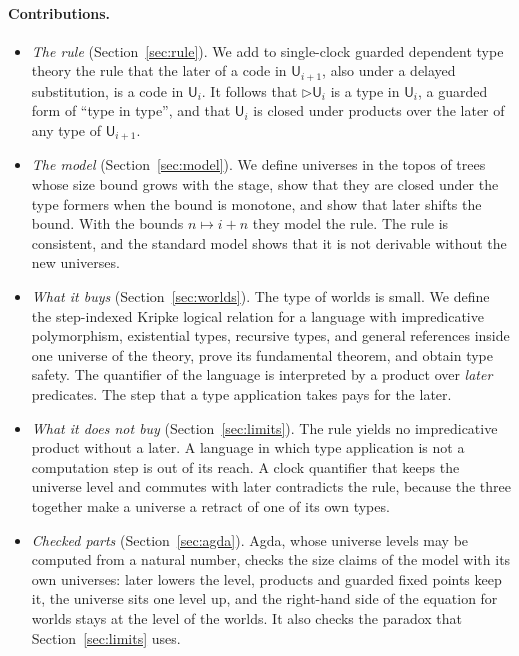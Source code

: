 \documentclass[acmsmall,nonacm,screen]{acmart}
\newcommand{\later}{{\triangleright}}
\newcommand{\Uv}{\mathsf{U}}
\begin{document}
\paragraph{Contributions.}
\begin{itemize}
\item \emph{The rule} (Section~\ref{sec:rule}). We add to single-clock guarded dependent type
  theory the rule that the later of a code in $\Uv_{i+1}$, also under a delayed substitution,
  is a code in $\Uv_i$. It follows that $\later\Uv_i$ is a type in $\Uv_i$, a guarded form of
  ``type in type'', and that $\Uv_i$ is closed under products over the later of any type of
  $\Uv_{i+1}$.
\item \emph{The model} (Section~\ref{sec:model}). We define universes in the topos of trees
  whose size bound grows with the stage, show that they are closed under the type formers
  when the bound is monotone, and show that later shifts the bound. With the bounds
  $n \mapsto i+n$ they model the rule. The rule is consistent, and the standard model shows
  that it is not derivable without the new universes.
\item \emph{What it buys} (Section~\ref{sec:worlds}). The type of worlds is small. We define
  the step-indexed Kripke logical relation for a language with impredicative polymorphism,
  existential types, recursive types, and general references inside one universe of the
  theory, prove its fundamental theorem, and obtain type safety. The quantifier of the
  language is interpreted by a product over \emph{later} predicates. The step that a type
  application takes pays for the later.
\item \emph{What it does not buy} (Section~\ref{sec:limits}). The rule yields no
  impredicative product without a later. A language in which type application is not a
  computation step is out of its reach. A clock quantifier that keeps the universe level
  and commutes with later contradicts the rule, because the three together make a universe
  a retract of one of its own types.
\item \emph{Checked parts} (Section~\ref{sec:agda}). Agda, whose universe levels may be
  computed from a natural number, checks the size claims of the model with its own
  universes: later lowers the level, products and guarded fixed points keep it, the
  universe sits one level up, and the right-hand side of the equation for worlds stays at
  the level of the worlds. It also checks the paradox that Section~\ref{sec:limits} uses.
\end{itemize}
\end{document}

